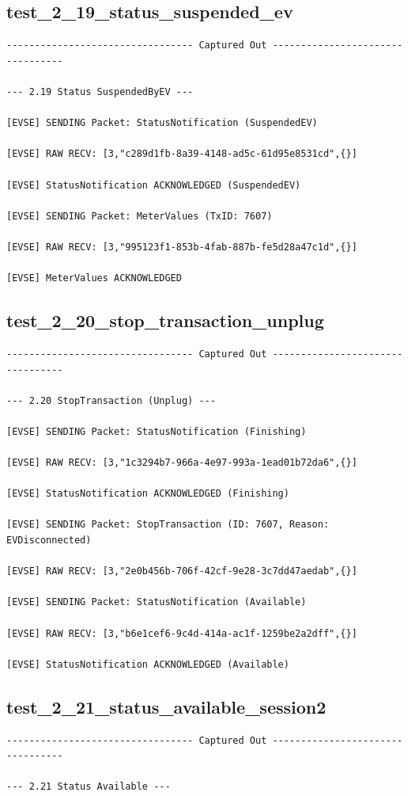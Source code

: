 \documentclass{article}
\begin{document}
\subsection*{test\_2\_19\_status\_suspended\_ev}
\begin{lstlisting}
--------------------------------- Captured Out ---------------------------------

--- 2.19 Status SuspendedByEV ---

[EVSE] SENDING Packet: StatusNotification (SuspendedEV)

[EVSE] RAW RECV: [3,"c289d1fb-8a39-4148-ad5c-61d95e8531cd",{}]

[EVSE] StatusNotification ACKNOWLEDGED (SuspendedEV)

[EVSE] SENDING Packet: MeterValues (TxID: 7607)

[EVSE] RAW RECV: [3,"995123f1-853b-4fab-887b-fe5d28a47c1d",{}]

[EVSE] MeterValues ACKNOWLEDGED
\end{lstlisting}
\subsection*{test\_2\_20\_stop\_transaction\_unplug}
\begin{lstlisting}
--------------------------------- Captured Out ---------------------------------

--- 2.20 StopTransaction (Unplug) ---

[EVSE] SENDING Packet: StatusNotification (Finishing)

[EVSE] RAW RECV: [3,"1c3294b7-966a-4e97-993a-1ead01b72da6",{}]

[EVSE] StatusNotification ACKNOWLEDGED (Finishing)

[EVSE] SENDING Packet: StopTransaction (ID: 7607, Reason: EVDisconnected)

[EVSE] RAW RECV: [3,"2e0b456b-706f-42cf-9e28-3c7dd47aedab",{}]

[EVSE] SENDING Packet: StatusNotification (Available)

[EVSE] RAW RECV: [3,"b6e1cef6-9c4d-414a-ac1f-1259be2a2dff",{}]

[EVSE] StatusNotification ACKNOWLEDGED (Available)
\end{lstlisting}
\subsection*{test\_2\_21\_status\_available\_session2}
\begin{lstlisting}
--------------------------------- Captured Out ---------------------------------

--- 2.21 Status Available ---
\end{lstlisting}
\end{document}
